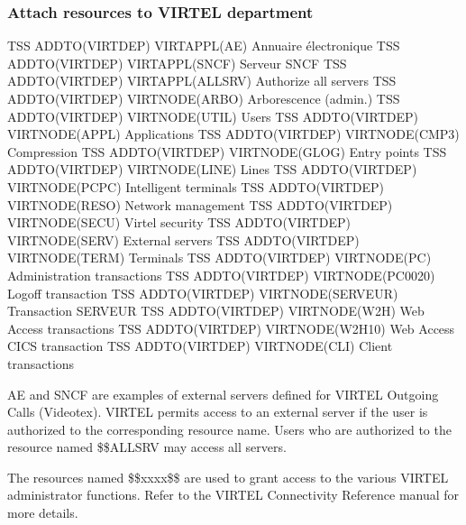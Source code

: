 \documentclass[letterpaper,10pt,english]{sphinxmanual}
\begin{document}
\subsubsection{Attach resources to VIRTEL department}
\label{\detokenize{Installation_Guide:attach-resources-to-virtel-department}}
\begin{sphinxVerbatim}[commandchars=\\\{\}]
TSS ADDTO(VIRTDEP) VIRTAPPL(AE) Annuaire électronique
TSS ADDTO(VIRTDEP) VIRTAPPL(SNCF) Serveur SNCF
TSS ADDTO(VIRTDEP) VIRTAPPL(\PYGZdl{}\PYGZdl{}ALLSRV) Authorize all servers
TSS ADDTO(VIRTDEP) VIRTNODE(\PYGZdl{}\PYGZdl{}ARBO\PYGZdl{}\PYGZdl{}) Arborescence (admin.)
TSS ADDTO(VIRTDEP) VIRTNODE(\PYGZdl{}\PYGZdl{}UTIL\PYGZdl{}\PYGZdl{}) Users
TSS ADDTO(VIRTDEP) VIRTNODE(\PYGZdl{}\PYGZdl{}APPL\PYGZdl{}\PYGZdl{}) Applications
TSS ADDTO(VIRTDEP) VIRTNODE(\PYGZdl{}\PYGZdl{}CMP3\PYGZdl{}\PYGZdl{}) Compression
TSS ADDTO(VIRTDEP) VIRTNODE(\PYGZdl{}\PYGZdl{}GLOG\PYGZdl{}\PYGZdl{}) Entry points
TSS ADDTO(VIRTDEP) VIRTNODE(\PYGZdl{}\PYGZdl{}LINE\PYGZdl{}\PYGZdl{}) Lines
TSS ADDTO(VIRTDEP) VIRTNODE(\PYGZdl{}\PYGZdl{}PCPC\PYGZdl{}\PYGZdl{}) Intelligent terminals
TSS ADDTO(VIRTDEP) VIRTNODE(\PYGZdl{}\PYGZdl{}RESO\PYGZdl{}\PYGZdl{}) Network management
TSS ADDTO(VIRTDEP) VIRTNODE(\PYGZdl{}\PYGZdl{}SECU\PYGZdl{}\PYGZdl{}) Virtel security
TSS ADDTO(VIRTDEP) VIRTNODE(\PYGZdl{}\PYGZdl{}SERV\PYGZdl{}\PYGZdl{}) External servers
TSS ADDTO(VIRTDEP) VIRTNODE(\PYGZdl{}\PYGZdl{}TERM\PYGZdl{}\PYGZdl{}) Terminals
TSS ADDTO(VIRTDEP) VIRTNODE(PC) Administration transactions
TSS ADDTO(VIRTDEP) VIRTNODE(PC\PYGZhy{}0020) Logoff transaction
TSS ADDTO(VIRTDEP) VIRTNODE(SERVEUR) Transaction SERVEUR
TSS ADDTO(VIRTDEP) VIRTNODE(W2H) Web Access transactions
TSS ADDTO(VIRTDEP) VIRTNODE(W2H\PYGZhy{}10) Web Access CICS transaction
TSS ADDTO(VIRTDEP) VIRTNODE(CLI) Client transactions
\end{sphinxVerbatim}

\sphinxAtStartPar
{}

\sphinxAtStartPar
AE and SNCF are examples of external servers defined for VIRTEL Outgoing Calls (Videotex). VIRTEL permits access to an external server if the user is authorized to the corresponding resource name. Users who are authorized to the resource named \$\$ALLSRV may access all servers.

\sphinxAtStartPar
The resources named \$\$xxxx\$\$ are used to grant access to the various VIRTEL administrator functions. Refer to the VIRTEL Connectivity Reference manual for more details.
\end{document}
